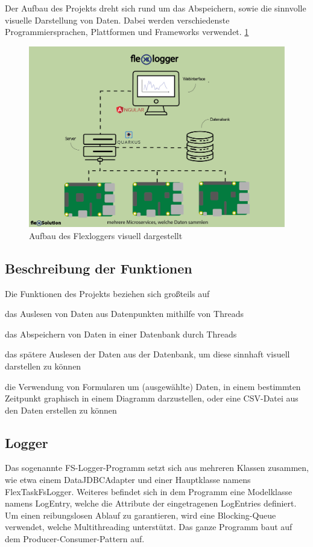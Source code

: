 Der Aufbau des Projekts dreht sich rund um das Abspeichern, sowie die sinnvolle visuelle Darstellung von Daten. Dabei werden verschiedenste Programmiersprachen, Plattformen und Frameworks verwendet. \ref{fig:impl:FlexLoggerAufbau}

\begin{figure}
    \centering
    \includegraphics[scale=0.7]{pics/webinterface.png}
    \caption{Aufbau des Flexloggers visuell dargestellt}
    \label{fig:impl:FlexLoggerAufbau}
\end{figure}

\subsection{Beschreibung der Funktionen}
Die Funktionen des Projekts beziehen sich großteils auf 
\begin{compactitem}
    \item das Auslesen von Daten aus Datenpunkten mithilfe von Threads
    \item das Abspeichern von Daten in einer Datenbank durch Threads
    \item das spätere Auslesen der Daten aus der Datenbank, um diese sinnhaft visuell darstellen zu können
    \item die Verwendung von Formularen um (ausgewählte) Daten, in einem bestimmten Zeitpunkt graphisch in einem Diagramm darzustellen, oder eine CSV-Datei aus den Daten erstellen zu können
\end{compactitem}


\subsection{Logger}
Das sogenannte FS-Logger-Programm setzt sich aus mehreren Klassen zusammen, wie etwa einem DataJDBCAdapter und einer Hauptklasse namens FlexTaskFsLogger. Weiteres befindet sich in dem Programm eine Modelklasse namens LogEntry, welche die Attribute der eingetragenen LogEntries definiert. Um einen reibungslosen Ablauf zu garantieren, wird eine Blocking-Queue verwendet, welche Multithreading unterstützt. Das ganze Programm baut auf dem Producer-Consumer-Pattern auf.          
 
